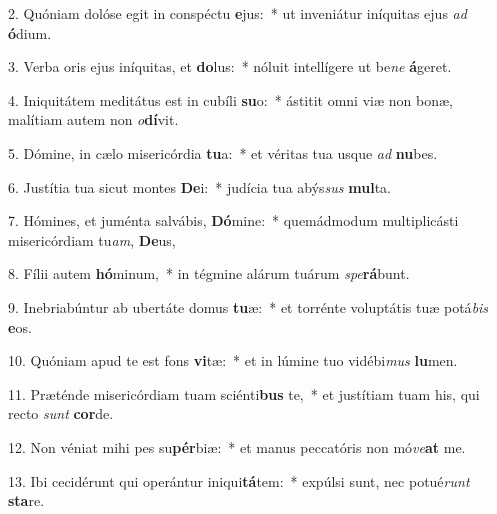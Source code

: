 2. Quóniam dolóse egit in conspéctu \textbf{e}jus:~*  ut inveniátur iníquitas ejus \textit{ad} \textbf{ó}dium.\

3. Verba oris ejus iníquitas, et \textbf{do}lus:~*  nóluit intellígere ut be\textit{ne} \textbf{á}geret.\

4. Iniquitátem meditátus est in cubíli \textbf{su}o:~*  ástitit omni viæ non bonæ, malítiam autem non \textit{o}\textbf{dí}vit.\

5. Dómine, in cælo misericórdia \textbf{tu}a:~*  et véritas tua usque \textit{ad} \textbf{nu}bes.\

6. Justítia tua sicut montes \textbf{De}i:~*  judícia tua abýs\textit{sus} \textbf{mul}ta.\

7. Hómines, et juménta salvábis, \textbf{Dó}mine:~*  quemádmodum multiplicásti misericórdiam tu\textit{am}, \textbf{De}us,\

8. Fílii autem \textbf{hó}minum,~*  in tégmine alárum tuárum \textit{spe}\textbf{rá}bunt.\

9. Inebriabúntur ab ubertáte domus \textbf{tu}æ:~*  et torrénte voluptátis tuæ potá\textit{bis} \textbf{e}os.\

10. Quóniam apud te est fons \textbf{vi}tæ:~*  et in lúmine tuo vidébi\textit{mus} \textbf{lu}men.\

11. Præténde misericórdiam tuam sciénti\textbf{bus} te,~*  et justítiam tuam his, qui recto \textit{sunt} \textbf{cor}de.\

12. Non véniat mihi pes su\textbf{pér}biæ:~*  et manus peccatóris non mó\textit{ve}\textbf{at} me.\

13. Ibi cecidérunt qui operántur iniqui\textbf{tá}tem:~*  expúlsi sunt, nec potué\textit{runt} \textbf{sta}re.\


